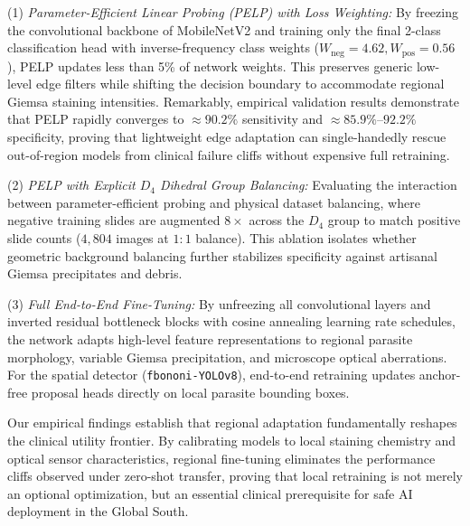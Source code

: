\documentclass[a4paper,11pt]{article}
\begin{document}
(1) \textit{Parameter-Efficient Linear Probing (PELP) with Loss Weighting:} By freezing the convolutional backbone of MobileNetV2 and training only the final 2-class classification head with inverse-frequency class weights ($W_{\text{neg}} = 4.62, W_{\text{pos}} = 0.56$), PELP updates less than 5\% of network weights. This preserves generic low-level edge filters while shifting the decision boundary to accommodate regional Giemsa staining intensities. Remarkably, empirical validation results demonstrate that PELP rapidly converges to $\approx 90.2\%$ sensitivity and $\approx 85.9\%\text{--}92.2\%$ specificity, proving that lightweight edge adaptation can single-handedly rescue out-of-region models from clinical failure cliffs without expensive full retraining.

(2) \textit{PELP with Explicit $D_4$ Dihedral Group Balancing:} Evaluating the interaction between parameter-efficient probing and physical dataset balancing, where negative training slides are augmented $8\times$ across the $D_4$ group to match positive slide counts ($4,804$ images at $1:1$ balance). This ablation isolates whether geometric background balancing further stabilizes specificity against artisanal Giemsa precipitates and debris.

(3) \textit{Full End-to-End Fine-Tuning:} By unfreezing all convolutional layers and inverted residual bottleneck blocks with cosine annealing learning rate schedules, the network adapts high-level feature representations to regional parasite morphology, variable Giemsa precipitation, and microscope optical aberrations. For the spatial detector (\texttt{fbononi-YOLOv8}), end-to-end retraining updates anchor-free proposal heads directly on local parasite bounding boxes.

Our empirical findings establish that regional adaptation fundamentally reshapes the clinical utility frontier. By calibrating models to local staining chemistry and optical sensor characteristics, regional fine-tuning eliminates the performance cliffs observed under zero-shot transfer, proving that local retraining is not merely an optional optimization, but an essential clinical prerequisite for safe AI deployment in the Global South.
\end{document}
